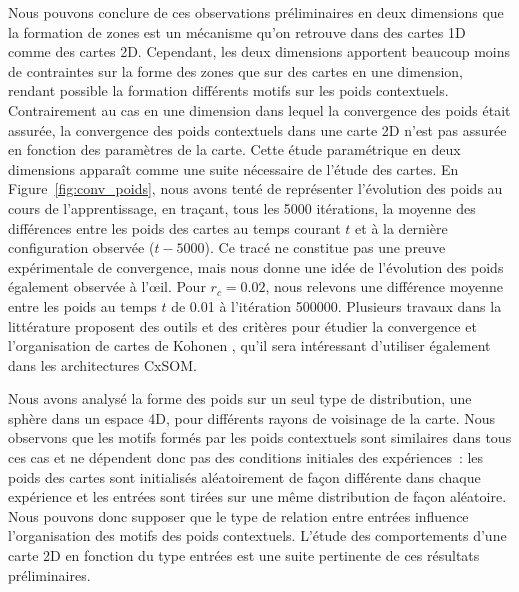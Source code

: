 \documentclass[../main]{subfiles}
\begin{document}
Nous pouvons conclure de ces observations préliminaires en deux dimensions que la formation de zones est un mécanisme qu'on retrouve dans des cartes 1D comme des cartes 2D.
Cependant, les deux dimensions apportent beaucoup moins de contraintes sur la forme des zones que sur des cartes en une dimension, rendant possible la formation différents motifs sur les poids contextuels. 
Contrairement au cas en une dimension dans lequel la convergence des poids était assurée, la convergence des poids contextuels dans une carte 2D n'est pas assurée en fonction des paramètres de la carte. Cette étude paramétrique en deux dimensions apparaît comme une suite nécessaire de l'étude des cartes.
En Figure~\ref{fig:conv_poids}, nous avons tenté de représenter l'évolution des poids au cours de l'apprentissage, en traçant, tous les 5000 itérations, la moyenne des différences entre les poids des cartes au temps courant $t$ et à la dernière configuration observée ($t - 5000$). Ce tracé ne constitue pas une preuve expérimentale de convergence, mais nous donne une idée de l'évolution des poids également observée à l'\oe{}il. Pour $r_c = 0.02$, nous relevons une différence moyenne entre les poids au temps $t$ de 0.01 à l'itération 500000.
Plusieurs travaux dans la littérature proposent des outils et des critères pour étudier la convergence et l'organisation de cartes de Kohonen \cite{Polani2001MeasuresFT, Breard2017EvaluatingSM, Tatoian2018SelfOrganizingMC}, qu'il sera intéressant d'utiliser également dans les architectures CxSOM.

Nous avons analysé la forme des poids sur un seul type de distribution, une sphère dans un espace 4D, pour différents rayons de voisinage de la carte.
Nous observons que les motifs formés par les poids contextuels sont similaires dans tous ces cas et ne dépendent donc pas des conditions initiales des expériences~: les poids des cartes sont initialisés aléatoirement de façon différente dans chaque expérience et les entrées sont tirées sur une même distribution de façon aléatoire.
Nous pouvons donc supposer que le type de relation entre entrées influence l'organisation des motifs des poids contextuels. L'étude des comportements d'une carte 2D en fonction du type entrées est une suite pertinente de ces résultats préliminaires.
\end{document}
